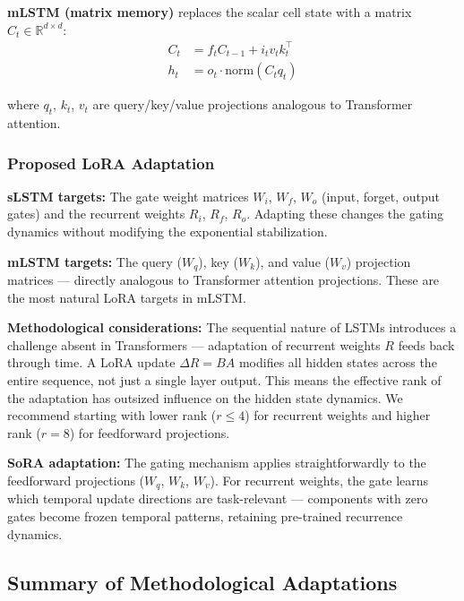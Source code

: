 \documentclass[12pt,a4paper]{article}
\theoremstyle{definition}
\begin{document}
\textbf{mLSTM (matrix memory)} replaces the scalar cell state with a matrix $C_t \in \mathbb{R}^{d \times d}$:
\begin{align}
C_t &= f_t C_{t-1} + i_t v_t k_t^\top \\
h_t &= o_t \cdot \text{norm}(C_t q_t)
\end{align}

where $q_t$, $k_t$, $v_t$ are query/key/value projections analogous to Transformer attention.

\subsubsection{Proposed LoRA Adaptation}

\textbf{sLSTM targets:} The gate weight matrices $W_i$, $W_f$, $W_o$ (input, forget, output gates) and the recurrent weights $R_i$, $R_f$, $R_o$. Adapting these changes the gating dynamics without modifying the exponential stabilization.

\textbf{mLSTM targets:} The query ($W_q$), key ($W_k$), and value ($W_v$) projection matrices — directly analogous to Transformer attention projections. These are the most natural LoRA targets in mLSTM.

\textbf{Methodological considerations:} The sequential nature of LSTMs introduces a challenge absent in Transformers — adaptation of recurrent weights $R$ feeds back through time. A LoRA update $\Delta R = BA$ modifies all hidden states across the entire sequence, not just a single layer output. This means the effective rank of the adaptation has outsized influence on the hidden state dynamics. We recommend starting with lower rank ($r \leq 4$) for recurrent weights and higher rank ($r=8$) for feedforward projections.

\textbf{SoRA adaptation:} The gating mechanism applies straightforwardly to the feedforward projections ($W_q$, $W_k$, $W_v$). For recurrent weights, the gate learns which temporal update directions are task-relevant — components with zero gates become frozen temporal patterns, retaining pre-trained recurrence dynamics.

\subsection{Summary of Methodological Adaptations}
\end{document}
